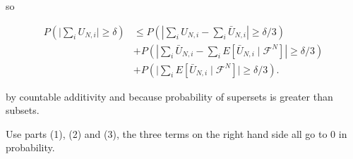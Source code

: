 \documentclass{article}
\begin{document}
so

\begin{align*}
P\left( \bigg\rvert \sum_i U_{N,i} \bigg\rvert  \ge \delta \right)  &\le P\left( \left| \sum_i U_{N,i} - \sum_i \bar{U}_{N,i}\right| \ge \delta/3 \right) \\
& + P \left( \left|\sum_i \bar{U}_{N,i} - \sum_i E[ \bar{U}_{N,i}  \mid \mathcal{F}^N] \right| \ge \delta/3 \right) \\
&+ P \left( \bigg\rvert \sum_i E[ \bar{U}_{N,i}  \mid \mathcal{F}^N]\bigg\rvert \ge \delta/3 \right ).
\end{align*}

by countable additivity and because probability of supersets is greater than subsets.

Use parts (1), (2) and (3), the three terms on the right hand side all go to $0$ in probability. 
\end{document}
